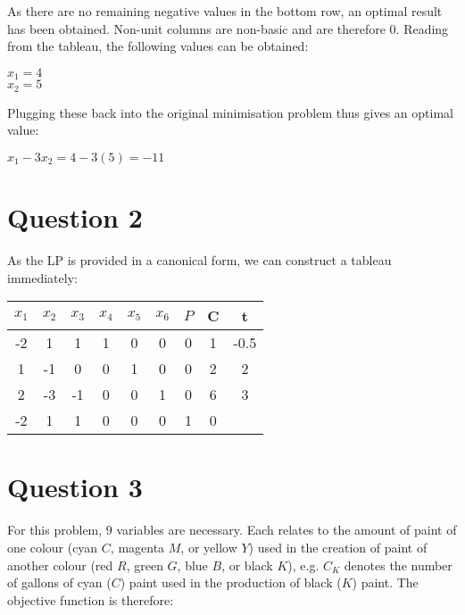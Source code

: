 \documentclass[11pt]{article} %
\begin{document}
As there are no remaining negative values in the bottom row, an optimal result has been obtained. Non-unit columns are non-basic and are therefore $0$. Reading from the tableau, the following values can be obtained:

\begin{center}

	$x_1 = 4$ \\
	$x_2 = 5$

\end{center}

Plugging these back into the original minimisation problem thus gives an optimal value:

\begin{center}

	$x_1 - 3x_2 = 4 - 3(5) = -11$

\end{center}

\clearpage

\section*{Question 2}

As the LP is provided in a canonical form, we can construct a tableau immediately:

\begin{center}

\begin{tabular}{ c c c c c c c | c | c }
  $x_1$ & $x_2$ & $x_3$ & $x_4$ & $x_5$ & $x_6$ & $P$ & C & t \\ \hline
  -2 & 1 & 1 & 1 & 0 & 0 & 0 & 1 & -0.5 \\
  1 & -1 & 0 & 0 & 1 & 0 & 0 & 2 & 2\\
  2 & -3 & -1 & 0 & 0 & 1 & 0 & 6 & 3 \\ \hline
  -2 & 1 & 1 & 0 & 0 & 0 & 1 & 0 & \\
\end{tabular}

\end{center}


\clearpage

\section*{Question 3}

For this problem, $9$ variables are necessary. Each relates to the amount of paint of one colour (cyan $C$, magenta $M$, or yellow $Y$) used in the creation of paint of another colour (red $R$, green $G$, blue $B$, or black $K$), e.g. $C_K$ denotes the number of gallons of cyan ($C$) paint used in the production of black ($K$) paint. The objective function is therefore:
\end{document}
